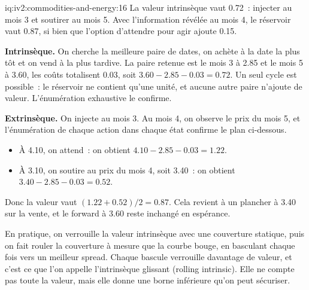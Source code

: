 \begin{solution}{iq:iv2:commodities-and-energy:16}
La valeur intrinsèque vaut 0.72~: injecter au mois 3 et soutirer au mois 5. Avec l'information révélée au mois 4, le réservoir vaut 0.87, si bien que l'option d'attendre pour agir ajoute 0.15.

\textbf{Intrinsèque.} On cherche la meilleure paire de dates, on achète à la date la plus tôt et on vend à la plus tardive. La paire retenue est le mois 3 à 2.85 et le mois 5 à 3.60, les coûts totalisent 0.03, soit $3.60 - 2.85 - 0.03 = 0.72$. Un seul cycle est possible~: le réservoir ne contient qu'une unité, et aucune autre paire n'ajoute de valeur. L'énumération exhaustive le confirme.

\textbf{Extrinsèque.} On injecte au mois 3. Au mois 4, on observe le prix du mois 5, et l'énumération de chaque action dans chaque état confirme le plan ci-dessous.
\begin{itemize}
\item À 4.10, on attend~: on obtient $4.10 - 2.85 - 0.03 = 1.22$.
\item À 3.10, on soutire au prix du mois 4, soit 3.40~: on obtient $3.40 - 2.85 - 0.03 = 0.52$.
\end{itemize}
Donc la valeur vaut $(1.22 + 0.52)/2 = 0.87$. Cela revient à un plancher à 3.40 sur la vente, et le forward à 3.60 reste inchangé en espérance.

En pratique, on verrouille la valeur intrinsèque avec une couverture statique, puis on fait rouler la couverture à mesure que la courbe bouge, en basculant chaque fois vers un meilleur spread. Chaque bascule verrouille davantage de valeur, et c'est ce que l'on appelle l'intrinsèque glissant (rolling intrinsic). Elle ne compte pas toute la valeur, mais elle donne une borne inférieure qu'on peut sécuriser.

\end{solution}

